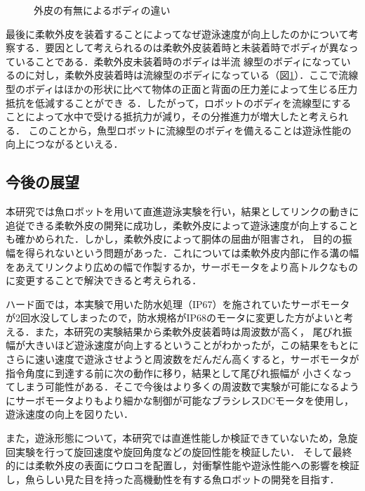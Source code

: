 \begin{figure}[t]
    \centering
    \caption{外皮の有無によるボディの違い}
    \label{fig:body}
\end{figure}

最後に柔軟外皮を装着することによってなぜ遊泳速度が向上したのかについて考察する．要因として考えられるのは柔軟外皮装着時と未装着時でボディが異なっていることである．柔軟外皮未装着時のボディは半流
線型のボディになっているのに対し，柔軟外皮装着時は流線型のボディになっている（図\ref{fig:body}）．ここで流線型のボディはほかの形状に比べて物体の正面と背面の圧力差によって生じる圧力抵抗を低減することができ
る．したがって，ロボットのボディを流線型にすることによって水中で受ける抵抗力が減り，その分推進力が増大したと考えられる．
このことから，魚型ロボットに流線型のボディを備えることは遊泳性能の向上につながるといえる．

\subsection{今後の展望}
本研究では魚ロボットを用いて直進遊泳実験を行い，結果としてリンクの動きに追従できる柔軟外皮の開発に成功し，柔軟外皮によって遊泳速度が向上することも確かめられた．しかし，柔軟外皮によって胴体の屈曲が阻害され，
目的の振幅を得られないという問題があった．これについては柔軟外皮内部に作る溝の幅をあえてリンクより広めの幅で作製するか，サーボモータをより高トルクなものに変更することで解決できると考えられる．

ハード面では，本実験で用いた防水処理（IP67）を施されていたサーボモータが2回水没してしまったので，防水規格がIP68のモータに変更した方がよいと考える．また，本研究の実験結果から柔軟外皮装着時は周波数が高く，
尾びれ振幅が大きいほど遊泳速度が向上するということがわかったが，この結果をもとにさらに速い速度で遊泳させようと周波数をだんだん高くすると，サーボモータが指令角度に到達する前に次の動作に移り，結果として尾びれ振幅が
小さくなってしまう可能性がある．そこで今後はより多くの周波数で実験が可能になるようにサーボモータよりもより細かな制御が可能なブラシレスDCモータを使用し，遊泳速度の向上を図りたい．

また，遊泳形態について，本研究では直進性能しか検証できていないため，急旋回実験を行って旋回速度や旋回角度などの旋回性能を検証したい．
そして最終的には柔軟外皮の表面にウロコを配置し，対衝撃性能や遊泳性能への影響を検証し，魚らしい見た目を持った高機動性を有する魚ロボットの開発を目指す．